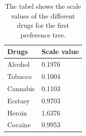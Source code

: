 % 
\begin{table}[H]
	\centering
	\begin{tabular}{@{}ll@{}}
		\toprule
		Drugs     & Scale value \\ \midrule
		Alcohol	  & 0.1976   \\
		Tobacco	  & 0.1004   \\
		Cannabis	  & 0.1103   \\
		Ecstasy	  & 0.9703   \\
		Heroin	  & 1.6376   \\
		Cocaine	  & 0.9953   \\	\bottomrule
	\end{tabular}
	\caption{The tabel shows the scale values of the different drugs for the first preference tree.}
	\label{tab:ScaleValues1}
\end{table} 
\noindent 
%

